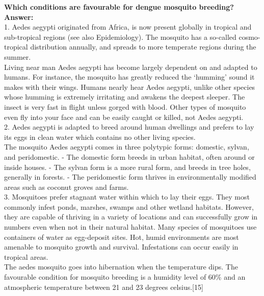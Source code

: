 \documentclass[11pt]{exam}
\begin{document}
\begin{questions}

\question
\label{8. Dengue: Favourable habitats }
\textbf{ Which conditions are favourable for dengue mosquito breeding?}\\
\textbf{Answer:}\\
1. Aedes aegypti originated from Africa, is now present globally in tropical and sub-tropical regions (see also Epidemiology). The mosquito has a so-called cosmo-tropical distribution annually, and spreads to more temperate regions during the summer. \\
Living near man Aedes aegypti has become largely dependent on and adapted to humans. For instance, the mosquito has greatly reduced the `humming' sound it makes with their wings. Humans nearly hear Aedes aegypti, unlike other species whose humming is extremely irritating and awakens the deepest sleeper. The insect is very fast in flight unless gorged with blood. Other types of mosquito even fly into your face and can be easily caught or killed, not Aedes aegypti.\\

2. Aedes aegypti is adapted to breed around human dwellings and prefers to lay its eggs in clean water which contains no other living species. \\
The mosquito Aedes aegypti comes in three polytypic forms: domestic, sylvan, and peridomestic.
- The domestic form breeds in urban habitat, often around or inside houses.
- The sylvan form is a more rural form, and breeds in tree holes, generally in forests.
- The peridomestic form thrives in environmentally modified areas such as coconut groves and farms.\\

3. Mosquitoes prefer stagnant water within which to lay their eggs. They most commonly infest ponds, marshes, swamps and other wetland habitats. However, they are capable of thriving in a variety of locations and can successfully grow in numbers even when not in their natural habitat. Many species of mosquitoes use containers of water as egg-deposit sites.
Hot, humid environments are most amenable to mosquito growth and survival. Infestations can occur easily in tropical areas. \\ %
The aedes mosquito goes into hibernation when the temperature dips. The favourable condition for mosquito breeding is a humidity level of 60\% and an atmospheric temperature between 21 and 23 degrees celsius.[15]\\


\end{questions}
\end{document}
